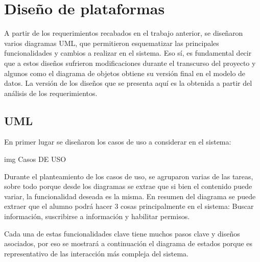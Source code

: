 \section{Diseño de plataformas}
    A partir de los requerimientos recabados en el trabajo anterior, se diseñaron varios diagramas UML, que permitieron esquematizar las principales funcionalidades y cambios a realizar en el sistema. Eso sí, es fundamental decir que a estos diseños sufrieron modificaciones durante el transcurso del proyecto y algunos como el diagrama de objetos obtiene su versión final en el modelo de datos. La versión de los diseños que se presenta aquí es la obtenida a partir del análisis de los requerimientos.

    \subsection{UML}
    \par En primer lugar se diseñaron los casos de uso a considerar en el sistema:

        img Casos DE USO

    \par Durante el planteamiento de los casos de uso, se agruparon varias de las tareas, sobre todo porque desde los diagramas se extrae que si bien el contenido puede variar, la funcionalidad deseada es la misma.
    En resumen del diagrama se puede extraer que el alumno podrá hacer 3 cosas principalmente en el sistema: Buscar información, suscribirse a información y habilitar permisos.
    \par Cada una de estas funcionalidades clave tiene muchos pasos clave y diseños asociados, por eso se mostrará a continuación el diagrama de estados porque es representativo de las interacción más compleja del sistema.

